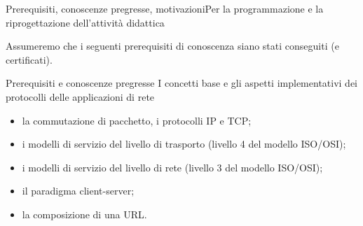 \documentclass[italian]{beamer}
\begin{document}
\begin{frame}[allowframebreaks]{Prerequisiti, conoscenze pregresse, motivazioni}{Per la programmazione e la riprogettazione dell'attivit\`a didattica}

	
	
	Assumeremo che i seguenti prerequisiti di conoscenza siano stati conseguiti (e certificati).
		
	\begin{block}{Prerequisiti e conoscenze pregresse}
		I concetti base e gli aspetti implementativi dei protocolli delle applicazioni di rete
		
		\begin{itemize}
			\item la commutazione di pacchetto, i protocolli IP e TCP;
			\item i modelli di servizio del livello di trasporto (livello 4 del modello ISO/OSI);
			\item i modelli di servizio del livello di rete (livello 3 del modello ISO/OSI);
			\item il paradigma client-server;
			\item la composizione di una URL.
		\end{itemize}
	\end{block}
	
		
		
	
	

		

\end{frame}
\end{document}
